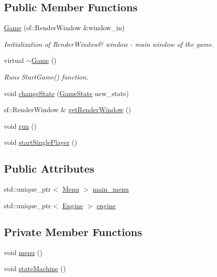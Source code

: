 \subsection*{Public Member Functions}
\begin{DoxyCompactItemize}
\item 
\hyperlink{class_game_a0010695fcd27f6fc91b37b5cf3ed0543}{Game} (sf\+::\+Render\+Window \&window\+\_\+in)
\begin{DoxyCompactList}\small\item\em Initialization of Render\+Window\& window -\/ main window of the game. \end{DoxyCompactList}\item 
virtual \hyperlink{class_game_ae3d112ca6e0e55150d2fdbc704474530}{$\sim$\+Game} ()
\begin{DoxyCompactList}\small\item\em Runs Start\+Game() function. \end{DoxyCompactList}\item 
void \hyperlink{class_game_a82e2140cdedd171aecaed897d3aea5a0}{change\+State} (\hyperlink{class_game_a7f57a7a8408e554d0a72882c287e1d04}{Game\+State} new\+\_\+state)
\item 
sf\+::\+Render\+Window \& \hyperlink{class_game_ada9faa2a1f4e1453420adead02fd9865}{get\+Render\+Window} ()
\item 
void \hyperlink{class_game_a1ab78f5ed0d5ea879157357cf2fb2afa}{run} ()
\item 
void \hyperlink{class_game_afbc524f7661c9ce1bea6ca45fd212093}{start\+Single\+Player} ()
\end{DoxyCompactItemize}
\subsection*{Public Attributes}
\begin{DoxyCompactItemize}
\item 
std\+::unique\+\_\+ptr$<$ \hyperlink{class_menu}{Menu} $>$ \hyperlink{class_game_ae08cf171b4f973d47def68d69f561e2c}{main\+\_\+menu}
\item 
std\+::unique\+\_\+ptr$<$ \hyperlink{class_engine}{Engine} $>$ \hyperlink{class_game_aee6b9ebe224001f736e1ed71a3b28223}{engine}
\end{DoxyCompactItemize}
\subsection*{Private Member Functions}
\begin{DoxyCompactItemize}
\item 
void \hyperlink{class_game_a463932fa7ca2f1ce243279bf2422fc48}{menu} ()
\item 
void \hyperlink{class_game_a8bc94200bfbf0421b83b7c2b2b45da72}{state\+Machine} ()
\end{DoxyCompactItemize}

